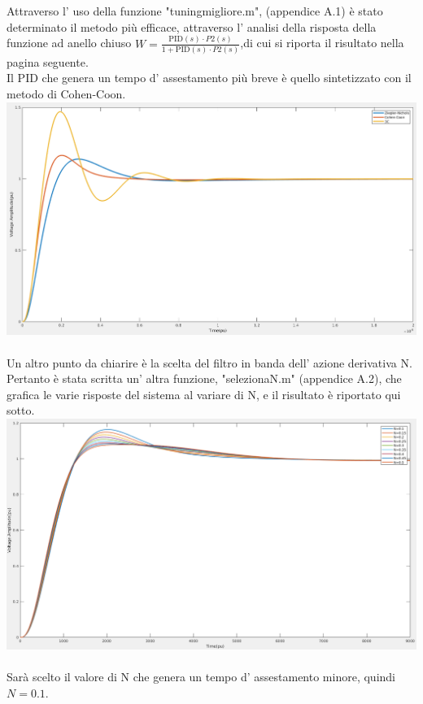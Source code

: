 \documentclass[Lau,noexaminfo]{sapthesis}
\begin{document}
	Attraverso l' uso della funzione "tuning\textunderscore migliore.m", (appendice A.1) è stato determinato il metodo più efficace, attraverso l' analisi della risposta della funzione ad anello chiuso $W=\frac{\text{PID}(s)\cdot P2(s)}{1+\text{PID}(s)\cdot P2(s)}$,di cui si riporta il risultato nella pagina seguente.\\
	Il PID che genera un tempo d' assestamento più breve è
	quello sintetizzato con il metodo di Cohen-Coon.\\
	\includegraphics[scale=0.4,angle=90]{step_response_metodi_P2}\\\\
	Un altro punto da chiarire è la scelta del filtro in banda dell' azione derivativa N. Pertanto è stata scritta un' altra funzione, "seleziona\textunderscore N.m" (appendice A.2), che grafica le varie risposte del sistema al variare di N, e il risultato è riportato qui sotto.\\
	\includegraphics[height=0.5\textheight,angle=-90]{vari_N}\\\\
	Sarà scelto il valore di N che genera un tempo d' assestamento minore, quindi $N=0.1$.
\end{document}
